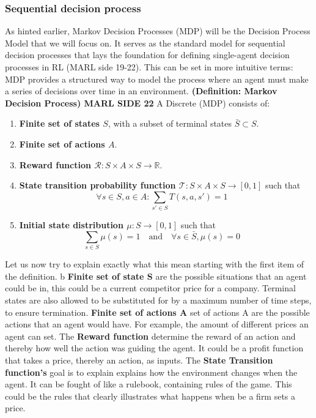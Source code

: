 \documentclass{article}
\begin{document}
\subsubsection{Sequential decision process}
As hinted earlier, Markov Decision Processes (MDP) will be the Decision Process Model that we will focus on. It serves as the standard model for sequential decision processes that lays the foundation for
defining single-agent decision processes in RL (MARL side 19-22). This can be set in more intuitive terms: MDP provides a structured way to model the process where an agent must make a series of decisions over time in an environment.
\newline
\textbf{(Definition: Markov Decision Process) MARL SIDE 22} A Discrete (MDP) consists of:
\begin{enumerate}
    \item \textbf{Finite set of states \( S \)}, with a subset of terminal states \( \bar{S} \subset S \).
    \item \textbf{Finite set of actions \( A \)}.
    \item \textbf{Reward function \( \mathcal{R}: S \times A \times S \to \mathbb{R} \)}.
    \item \textbf{State transition probability function \( \mathcal{T}: S \times A \times S \to [0, 1] \)} such that
    \[
    \forall s \in S, a \in A : \sum_{s' \in S} T(s, a, s') = 1 \quad 
    \]
    \item \textbf{Initial state distribution \( \mu: S \to [0, 1] \)} such that
    \[
    \sum_{s \in S} \mu(s) = 1 \quad \text{and} \quad \forall s \in \bar{S}, \mu(s) = 0 \quad 
    \]
\end{enumerate}
Let us now try to explain exactly what this mean starting with the first item of the definition.
b\newline 
\textbf{Finite set of state S}  are the possible situations that an agent could be in, this could be a current competitor price for a company. Terminal states are also allowed to be substituted for by a maximum number of time steps, to ensure termination. 
\textbf{Finite set of actions A} set of actions A are the possible actions that an agent would have. For example, the amount of different prices an agent can set. 
The \textbf{Reward function} determine the reward of an action and thereby how well the action was guiding the agent. It could be a profit function that takes a price, thereby an action, as inputs. The \textbf{State Transition function's} goal is to explain explains how the environment changes when the agent. It can be fought of like a rulebook, containing rules of the game. This could be the rules that clearly illustrates what happens when be a firm sets a price. 
\end{document}
